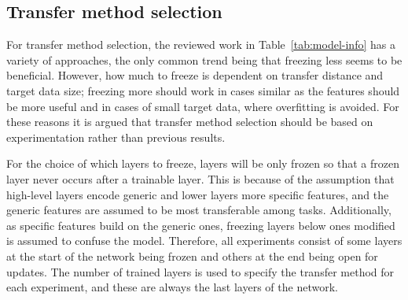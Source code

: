 \documentclass[english,twoside,openright]{UH_DS_MSc}
\begin{document}

\subsection{Transfer method selection}



For transfer method selection, the reviewed work in Table~\ref{tab:model-info} has a variety of approaches, 
the only common trend being that freezing less seems to be beneficial. 
However, how much to freeze is dependent on transfer distance and target data size;
freezing more should work in cases similar as the features should be more useful 
and in cases of small target data, where overfitting is avoided.
For these reasons it is argued that transfer method selection should be
based on experimentation rather than previous results.

For the choice of which layers to freeze, layers will be only frozen so that a frozen layer never 
occurs after a trainable layer. This is because of the assumption that high-level layers 
encode generic and lower layers more specific features, and the generic features are assumed to be most transferable among tasks.
 Additionally, as specific features build on the generic ones, freezing layers 
below ones modified is assumed to confuse the model. Therefore, all experiments consist of some layers 
at the start of the network being frozen and others at the end being open for updates.
The number of trained layers is used to specify the transfer method 
for each experiment, and these are always the last layers of the network.
\end{document}
